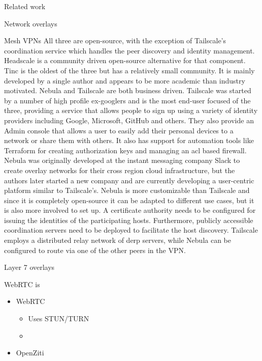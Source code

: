 \begin{frame}[fragile]{Related work}
\begin{block}{Network overlays}
\begin{block}{Mesh VPNs}
All three are open-source, with the exception of Tailscale's
coordination service which handles the peer discovery and identity
management. Headscale \autocite{fontJuanfontHeadscale2022} is a
community driven open-source alternative for that component. Tinc is the
oldest of the three but has a relatively small community. It is mainly
developed by a single author and appears to be more academic than
industry motivated. Nebula and Tailscale are both business driven.
Tailscale was started by a number of high profile ex-googlers and is the
most end-user focused of the three, providing a service that allows
people to sign up using a variety of identity providers including
Google, Microsoft, GitHub and others. They also provide an Admin console
that allows a user to easily add their personal devices to a network or
share them with others. It also has support for automation tools like
Terraform for creating authorization keys and managing an \gls{acl}
based firewall. Nebula was originally developed at the instant messaging
company Slack to create overlay networks for their cross region cloud
infrastructure, but the authors later started a new company and are
currently developing a user-centric platform similar to Tailscale's.
Nebula is more customizable than Tailscale and since it is completely
open-source it can be adapted to different use cases, but it is also
more involved to set up. A certificate authority needs to be configured
for issuing the identities of the participating hosts. Furthermore,
publicly accessible coordination servers need to be deployed to
facilitate the host discovery. Tailscale employs a distributed relay
network of \gls{derp} servers, while Nebula can be configured to route
via one of the other peers in the VPN.
\end{block}

\begin{block}{Layer 7 overlays}
\protect\hypertarget{thesis__020-related-work.md__layer-7-overlays}{}
\begin{block}{WebRTC is}
\protect\hypertarget{thesis__020-related-work.md__webrtc-is}{}
\begin{itemize}
\tightlist
\item
  WebRTC

  \begin{itemize}
  \tightlist
  \item
    Uses STUN/TURN
  \item
  \end{itemize}
\item
  OpenZiti


\end{itemize}
\end{block}
\end{block}
\end{block}
\end{frame}
